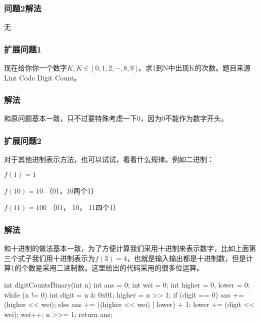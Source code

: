 \subsubsection{问题2解法}
无

\subsubsection{扩展问题1}
现在给你你一个数字$K, K \in [0, 1, 2, \cdots , 8, 9]$。求1到N中出现K的次数。题目来源 Lint Code Digit Count。

\subsubsection{解法}
和原问题基本一致，只不过要特殊考虑一下0，因为0不能作为数字开头。

\subsubsection{扩展问题2}
对于其他进制表示方法，也可以试试，看看什么规律。例如二进制：

$f(1) = 1$

$f(10) = 10$ （01，10两个1）

$f(11) = 100$ （01， 10， 11四个1）


\subsubsection{解法}
和十进制的做法基本一致，为了方便计算我们采用十进制来表示数字，比如上面第三个式子我们用十进制表示为$f(3) = 4$，也就是输入输出都是十进制数，但是计算1的个数是采用二进制数。这里给出的代码采用的很多位运算。
\begin{Codex}[label={[$O(lg(N))+O(1)$]Chap02_04_Ones.java}]
	int digitCountsBinary(int n) {
		int ans = 0;
		int wei = 0;
		int higher = 0, lower = 0;
		while (n != 0) {
			int digit = n & 0x01;
			higher = n >> 1;
			if (digit == 0) {
				ans += (higher << wei);
			} else {
			ans += ((higher << wei) | lower) + 1;
		}
		lower += (digit << wei);
		wei++;
		n >>= 1;
	}
	return ans;
}
\end{Codex}

